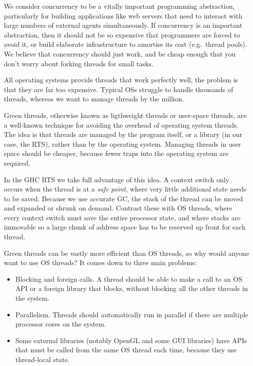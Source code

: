 \documentclass{article}
\begin{document}
{We consider concurrency to be a vitally important programming
abstraction, particularly for building applications like web servers
that need to interact with large numbers of external agents
simultaneously.  If concurrency is an important abstraction, then it
should not be so expensive that programmers are forced to avoid it, or
build elaborate infrastructure to amortise its cost (e.g.\ thread
pools).  We believe that concurrency should just work, and be cheap
enough that you don't worry about forking threads for small tasks.

All operating systems provide threads that work perfectly well, the
problem is that they are far too expensive.  Typical OSs struggle to
handle thousands of threads, whereas we want to manage threads by the
million.

Green threads, otherwise known as ligthweight threads or user-space
threads, are a well-known technique for avoiding the overhead of
operating system threads.  The idea is that threads are managed by the
program itself, or a library (in our case, the RTS), rather than by
the operating system.  Managing threads in user space should be
cheaper, because fewer traps into the operating system are required.

In the GHC RTS we take full advantage of this idea.  A context switch
only occurs when the thread is at a \emph{safe point}, where very
little additional state needs to be saved.  Because we use accurate
GC, the stack of the thread can be moved and expanded or shrunk on
demand.  Contrast these with OS threads, where every context switch
must save the entire processor state, and where stacks are immovable
so a large chunk of address space has to be reserved up front for
each thread.

Green threads can be vastly more efficient than OS threads, so why
would anyone want to use OS threads?  It comes down to three main
problems:

\begin{itemize}
\item Blocking and foreign calls.  A thread should be able to make a
  call to an OS API or a foreign library that blocks, without blocking
  all the other threads in the system.

\item Parallelism.  Threads should automatically run in parallel if
  there are multiple processor cores on the system.

\item Some external libraries (notably OpenGL and some GUI libraries)
  have APIs that must be called from the same OS thread each time,
  because they use thread-local state.
\end{itemize}

}
\end{document}

